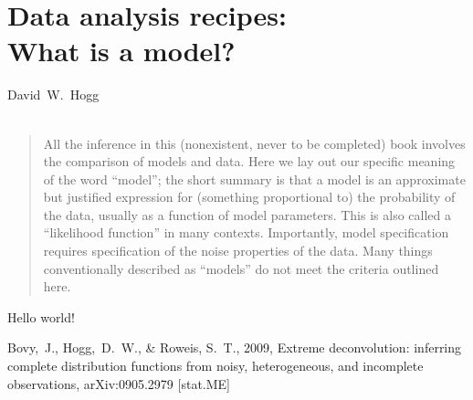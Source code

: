 \documentclass[12pt,twoside]{article}
\begin{document}
\thispagestyle{plain}\raggedbottom
\section*{Data analysis recipes:\ \\
  What is a model?\footnotemark}


\noindent
David~W.~Hogg\\
\\

\begin{abstract}
  All the inference in this (nonexistent, never to be completed) book
  involves the comparison of models and data.  Here we lay out our
  specific meaning of the word ``model''; the short summary is that a
  model is an approximate but justified expression for (something
  proportional to) the probability of the data, usually as a function
  of model parameters.  This is also called a ``likelihood function''
  in many contexts.  Importantly, model specification requires
  specification of the noise properties of the data.  Many things
  conventionally described as ``models'' do not meet the criteria
  outlined here.
\end{abstract}

Hello world!

\clearpage
{}\theendnotes

\clearpage
\begin{thebibliography}{}
  Bovy,~J., Hogg,~D.~W., \& Roweis, S.~T., 2009,
  Extreme deconvolution: inferring complete distribution functions from noisy, heterogeneous, and incomplete observations, 
  arXiv:0905.2979 [stat.ME]
\end{thebibliography}
\end{document}
